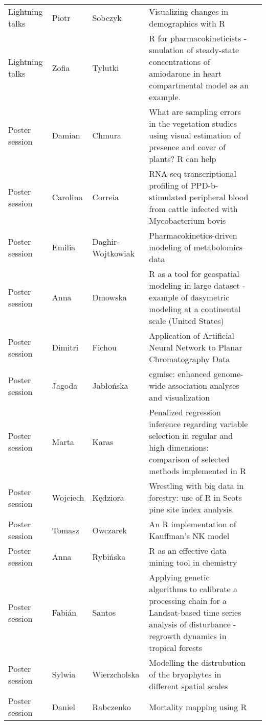 \begin{longtable}{|p{2.2cm}|p{1.5cm}|p{1.7cm}|p{4cm}|p{1.5cm}|}
  Lightning talks & Piotr & Sobczyk & Visualizing changes in demographics with R &  \\ 
  Lightning talks & Zofia & Tylutki & R for pharmacokineticists - smulation of steady-state concentrations of amiodarone in heart compartmental model as an example. &  \\ 
  \hline
  Poster session & Damian & Chmura & What are sampling errors in the vegetation studies using visual estimation of presence and cover of plants? R can help &  \\ 
  Poster session & Carolina & Correia & RNA-seq transcriptional profiling of PPD-b-stimulated peripheral blood from cattle infected with Mycobacterium bovis &  \\ 
  Poster session & Emilia & Daghir-Wojtkowiak & Pharmacokinetics-driven modeling of metabolomics data &  \\ 
  Poster session & Anna & Dmowska & R as a tool for geospatial modeling in large dataset - example of dasymetric modeling at a continental scale (United States) &  \\ 
  Poster session & Dimitri & Fichou & Application of Artificial Neural Network to Planar Chromatography Data &  \\ 
  Poster session & Jagoda & Jabłońska & cgmisc: enhanced genome-wide association analyses and visualization &  \\ 
  Poster session & Marta & Karas & Penalized regression inference regarding variable selection in regular and high dimensions: comparison of selected methods implemented in R &  \\ 
  Poster session & Wojciech & Kędziora & Wrestling with big data in forestry: use of R in Scots pine site index analysis. &  \\ 
  Poster session & Tomasz & Owczarek & An R implementation of Kauffman's NK model &  \\ 
  Poster session & Anna & Rybińska & R as an effective data mining tool in chemistry &  \\ 
  Poster session & Fabián & Santos & Applying genetic algorithms to calibrate a processing chain for a Landsat-based time series analysis of disturbance - regrowth dynamics in tropical forests &  \\ 
  Poster session & Sylwia & Wierzcholska & Modelling the distrubution of the bryophytes in different spatial scales &  \\ 
  Poster session & Daniel & Rabczenko & Mortality mapping using R &  \\ 
   \hline
\end{longtable}
\endgroup
